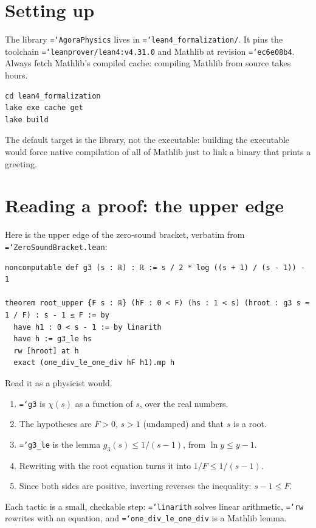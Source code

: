 \documentclass[11pt,a4paper,openany]{book}
\newcommand{\code}[1]{\texttt{\hyphenchar\font=`\-\relax #1}}
\theoremstyle{definition}
\theoremstyle{plain}
\begin{document}
\section{Setting up}

The library \code{AgoraPhysics} lives in \code{lean4\_formalization/}. It pins the toolchain
\code{leanprover/lean4:v4.31.0} and Mathlib at revision \code{ec6e08b4}. Always fetch Mathlib's
compiled cache: compiling Mathlib from source takes hours.

\begin{runit}
\begin{verbatim}
cd lean4_formalization
lake exe cache get
lake build
\end{verbatim}
The default target is the library, not the executable: building the executable would force native
compilation of all of Mathlib just to link a binary that prints a greeting.
\end{runit}

\section{Reading a proof: the upper edge}

Here is the upper edge of the zero-sound bracket, verbatim from \code{ZeroSoundBracket.lean}:
\begin{lstlisting}
noncomputable def g3 (s : ℝ) : ℝ := s / 2 * log ((s + 1) / (s - 1)) - 1

theorem root_upper {F s : ℝ} (hF : 0 < F) (hs : 1 < s) (hroot : g3 s = 1 / F) : s - 1 ≤ F := by
  have h1 : 0 < s - 1 := by linarith
  have h := g3_le hs
  rw [hroot] at h
  exact (one_div_le_one_div hF h1).mp h
\end{lstlisting}
Read it as a physicist would.
\begin{enumerate}
  \item \code{g3} is $\chi(s)$ as a function of $s$, over the real numbers.
  \item The hypotheses are $F>0$, $s>1$ (undamped) and that $s$ is a root.
  \item \code{g3\_le} is the lemma $g_3(s)\le1/(s-1)$, from $\ln y\le y-1$.
  \item Rewriting with the root equation turns it into $1/F\le1/(s-1)$.
  \item Since both sides are positive, inverting reverses the inequality: $s-1\le F$.
\end{enumerate}
Each tactic is a small, checkable step: \code{linarith} solves linear arithmetic, \code{rw}
rewrites with an equation, and \code{one\_div\_le\_one\_div} is a Mathlib lemma.
\end{document}
